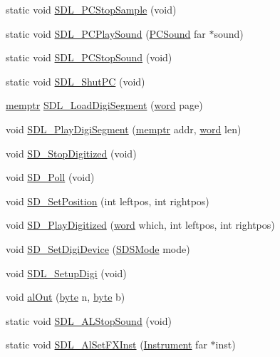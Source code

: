 \begin{DoxyCompactItemize}
\item 
static void \hyperlink{ID__SD_8C_a6cca2dc7a94fe6d4e6a69b7f320b452a}{SDL\_\-PCStopSample} (void)
\item 
static void \hyperlink{ID__SD_8C_ac3a9aef21cbe8fed7a8e4d3859acf1ec}{SDL\_\-PCPlaySound} (\hyperlink{structPCSound}{PCSound} far $\ast$sound)
\item 
static void \hyperlink{ID__SD_8C_a8fdd4a72618197048986b80ee715e96f}{SDL\_\-PCStopSound} (void)
\item 
static void \hyperlink{ID__SD_8C_ad8432c97c60c7aab1e75effb21ac2dbc}{SDL\_\-ShutPC} (void)
\item 
\hyperlink{ID__MM_8H_a04062decc7eb282b066c65e9137bb9bf}{memptr} \hyperlink{ID__SD_8C_a2ce9d108bad58960b55ec764a03a8490}{SDL\_\-LoadDigiSegment} (\hyperlink{ID__HEAD_8H_abad51e07ab6d26bec9f1f786c8d65bcd}{word} page)
\item 
void \hyperlink{ID__SD_8C_aaf1484a4a6ce7f6fa4a457033cf03515}{SDL\_\-PlayDigiSegment} (\hyperlink{ID__MM_8H_a04062decc7eb282b066c65e9137bb9bf}{memptr} addr, \hyperlink{ID__HEAD_8H_abad51e07ab6d26bec9f1f786c8d65bcd}{word} len)
\item 
void \hyperlink{ID__SD_8C_af508ee24c35bb22fae070def8e7c80ac}{SD\_\-StopDigitized} (void)
\item 
void \hyperlink{ID__SD_8C_a77ae2ddf3d133b4eadcca562a7d2c9d0}{SD\_\-Poll} (void)
\item 
void \hyperlink{ID__SD_8C_af4e5a3078b10a358cf45bd82c027bf83}{SD\_\-SetPosition} (int leftpos, int rightpos)
\item 
void \hyperlink{ID__SD_8C_a2807a99740c2e669483908fc03bda952}{SD\_\-PlayDigitized} (\hyperlink{ID__HEAD_8H_abad51e07ab6d26bec9f1f786c8d65bcd}{word} which, int leftpos, int rightpos)
\item 
void \hyperlink{ID__SD_8C_a9013619e30cc0d50d576724ca21f342a}{SD\_\-SetDigiDevice} (\hyperlink{ID__SD_8H_a5d22d74f0369393939a5d3cf1dcfdaf3}{SDSMode} mode)
\item 
void \hyperlink{ID__SD_8C_aaa6e5b91a13ba85fc9628f255947e8e5}{SDL\_\-SetupDigi} (void)
\item 
void \hyperlink{ID__SD_8C_a022c0a65b79644cb7ea86a2ce77b3c42}{alOut} (\hyperlink{ID__HEAD_8H_a0c8186d9b9b7880309c27230bbb5e69d}{byte} n, \hyperlink{ID__HEAD_8H_a0c8186d9b9b7880309c27230bbb5e69d}{byte} b)
\item 
static void \hyperlink{ID__SD_8C_ac4a243a2df697871871f0d62df9248db}{SDL\_\-ALStopSound} (void)
\item 
static void \hyperlink{ID__SD_8C_ab8f9c2968095da11c38e622b6026b595}{SDL\_\-AlSetFXInst} (\hyperlink{structInstrument}{Instrument} far $\ast$inst)

\end{DoxyCompactItemize}
